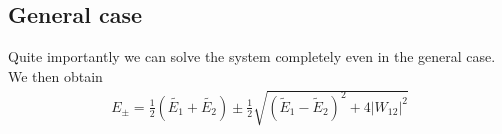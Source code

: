 \subsection{General case}

Quite importantly we can solve the system completely even in the general case. We then obtain 
\begin{align}\label{eq:Epm}
E_\pm = \frac{1}{2}\left(\tilde{E_1}+\tilde{E_2}\right) \pm \frac{1}{2} \sqrt{\left(\tilde{E}_1-\tilde{E}_2\right)^2+4 \left|W_{12}\right|^2}
			\end{align}